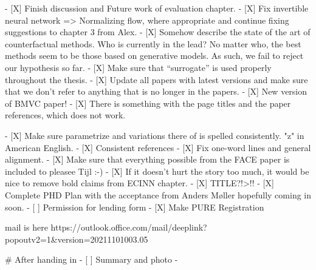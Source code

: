   - [X] Finish discussion and Future work of evaluation chapter.
  - [X] Fix invertible neural network => Normalizing flow, where appropriate and continue fixing suggestions to chapter 3 from Alex.
  - [X] Somehow describe the state of the art of counterfactual methods. Who is currently in the lead? No matter who, the best methods seem to be those based on generative models. As such, we fail to reject our hypothesis so far. 
  - [X] Make sure that ``surrogate'' is used properly throughout the thesis. 
  - [X] Update all papers with latest versions and make sure that we don't refer to anything that is no longer in the papers. 
  - [X] New version of BMVC paper!
  - [X] There is something with the page titles and the paper references, which does not work.
  
  - [X] Make sure parametrize and variations there of is spelled consistently. "z" in American English.
  - [X] Consistent references
  - [X] Fix one-word lines and general alignment.
  - [X] Make sure that everything possible from the FACE paper is included to pleasee Tijl :-)
  - [X] If it doesn't hurt the story too much, it would be nice to remove bold claims from ECINN chapter.
  - [X] TITLE?!>!!
  - [X] Complete PHD Plan with the acceptance from Anders Møller hopefully coming in soon. 
  - [ ] Permission for lending form
  - [X] Make PURE Registration  
  
  mail is here https://outlook.office.com/mail/deeplink?popoutv2=1&version=20211101003.05
  
  # After handing in
  - [ ] Summary and photo
  - 